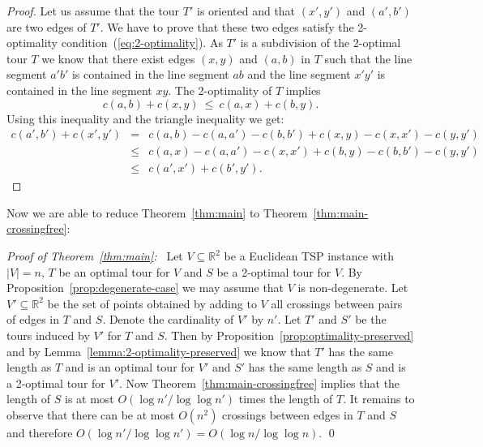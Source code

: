 \documentclass[a4paper, 11pt]{article}
\begin{document}
\begin{proof}
Let us assume that the tour $T'$ is oriented and that $(x',y')$ and $(a',b')$ are two edges of $T'$. We have to prove that 
these two edges satisfy the 2-optimality condition~(\ref{eq:2-optimality}). 
As $T'$ is a subdivision of the 2-optimal tour $T$ we know that there exist edges $(x,y)$ and $(a,b)$ in $T$ such that
the line segment $a'b'$ is contained in the line segment $ab$ and the line segment $x'y'$ is contained in the line segment 
$xy$. The 2-optimality of $T$ implies
\[ c(a,b) + c(x,y) ~\le~ c(a,x) + c(b,y) .\]
Using this inequality and the triangle inequality we get:
\begin{eqnarray*}
c(a',b') + c(x', y') & =   & c(a,b) - c(a,a') - c(b,b') + c(x,y) - c(x,x') - c(y,y') \\
                     & \le & c(a,x) - c(a,a') - c(x,x') + c(b,y) - c(b,b') - c(y,y') \\
                     & \le & c(a',x') + c(b',y') .
\end{eqnarray*}             
\end{proof}


Now we are able to reduce Theorem~\ref{thm:main} to Theorem~\ref{thm:main-crossingfree}:

\noindent
\textit{Proof of Theorem~\ref{thm:main}:~}
Let $V\subseteq \mathbb{R}^2$ be a Euclidean TSP instance with $|V| = n$,  $T$ be an optimal tour for $V$ and
$S$ be a 2-optimal tour for $V$. 
By Proposition~\ref{prop:degenerate-case} we may assume that $V$ is non-degenerate.
Let $V'\subseteq \mathbb{R}^2$ be the set of points obtained by adding to $V$ all
crossings between pairs of edges in $T$ and $S$. 
Denote the cardinality of $V'$ by $n'$. 
Let $T'$ and $S'$ be the tours induced by $V'$ for $T$ and $S$. 
Then by Proposition~\ref{prop:optimality-preserved}
and by Lemma~\ref{lemma:2-optimality-preserved} we know that $T'$ has the same length as $T$ and is an optimal tour for $V'$ 
and $S'$ has the same length as $S$ and is a 2-optimal tour for $V'$.
Now Theorem~\ref{thm:main-crossingfree} implies that the length of $S$ is at most 
$O(\log n' / \log \log n')$ times the length of $T$. It remains to observe that there can be at most $O(n^2)$ crossings between 
edges in $T$ and $S$ and therefore $O(\log n' / \log \log n') = O(\log n / \log \log n)$.
\qed
\medskip
\end{document}
